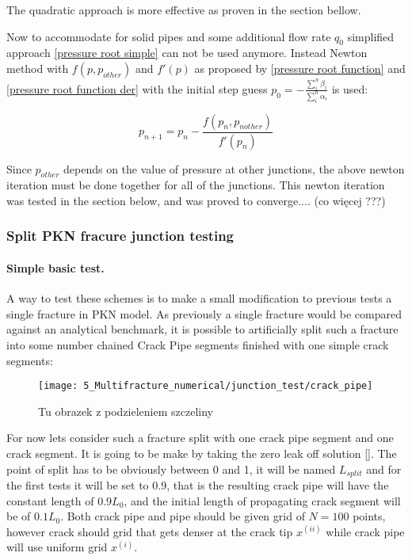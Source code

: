 The quadratic approach is more effective as proven in the section bellow.

Now to accommodate for solid pipes and some additional flow rate $q_0$ simplified approach \eqref{pressure root simple} can not be used anymore. Instead Newton method with $f(p,p_{other})$ and $f'(p)$ as proposed by \eqref{pressure root function} and \eqref{pressure root function der}  with the initial step guess  $p_0=-\frac{ \sum_i^n \beta_i }{\sum_i^n \alpha_i}$ is used:

\begin{equation}
	\label{newton root}
	p_{n+1}=p_n-\frac{f(p_n,p_{n other})}{f'(p_n)}
\end{equation}

Since $p_{other}$ depends on the value of pressure at other junctions, the above newton iteration must be done together for all of the junctions. This newton iteration was tested in the section below, and was proved to converge.... (co więcej ???) 

\subsubsection{Split PKN fracure junction testing}


\paragraph{Simple basic test.}

A way to test these schemes is to make a small modification to previous tests a single fracture in PKN model. As previously a single fracture would be compared against an analytical benchmark, it is possible to artificially split such a fracture into some number chained Crack Pipe segments finished with one simple crack segments:

\begin{figure}[H]
  \centering
      \texttt{[image: 5\_Multifracture\_numerical/junction\_test/crack\_pipe]}
  \caption{Tu obrazek z podzieleniem szczeliny}
\end{figure}

For now lets consider such a fracture split with one crack pipe segment and one crack segment. It is going to be make by taking the zero leak off solution \eqref{}. The point of split has to be obviously between 0 and 1, it will be named $L_{split}$ and for the first tests it will be set to 0.9, that is the resulting crack pipe will have the constant length of $0.9 L_0$, and the initial length of propagating crack segment will be of $0.1 L_0$. Both crack pipe and  pipe should be given grid of $N=100$ points, however crack should grid that gets denser at the crack tip $x^{(ii)}$ while crack pipe will use uniform grid  $x^{(i)}$.


